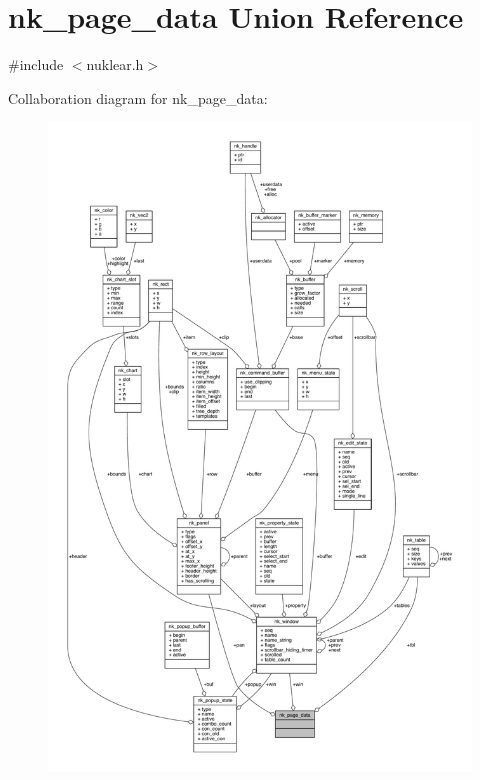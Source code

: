 \hypertarget{unionnk__page__data}{}\section{nk\+\_\+page\+\_\+data Union Reference}
\label{unionnk__page__data}


{\ttfamily \#include $<$nuklear.\+h$>$}



Collaboration diagram for nk\+\_\+page\+\_\+data\+:
\nopagebreak
\begin{figure}[H]
\begin{center}
\leavevmode
\includegraphics[width=350pt]{unionnk__page__data__coll__graph}
\end{center}
\end{figure}
